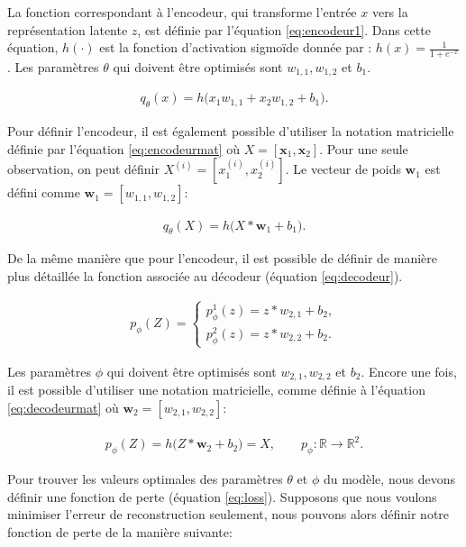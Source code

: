 La fonction correspondant à l'encodeur, qui transforme l'entrée $x$ vers la représentation latente $z$, est définie par l'équation \ref{eq:encodeur1}. Dans cette équation, $h(\cdot)$ est la fonction d'activation sigmoïde donnée par : $h(x)=\frac{1}{1+e^{-x}}$. Les paramètres $\theta$ qui doivent être optimisés sont $w_{1,1}, w_{1,2}$ et $b_1$. 

\begin{gather}  \label{eq:encodeur1}
q_{\theta}(x)=h\big(x_1w_{1,1} + x_2 w_{1,2} + b_1\big).
\end{gather}

Pour définir l'encodeur, il est également possible d'utiliser la notation matricielle définie par l'équation \ref{eq:encodeurmat} où $X = [\boldsymbol x_1, \boldsymbol x_2]$. Pour une seule observation, on peut définir $X^{(i)} = [x_{1}^{(i)}, x_{2}^{(i)}]$. Le vecteur de poids $\boldsymbol w_1$ est défini comme $\boldsymbol w_1 = [w_{1,1}, w_{1,2}]$:

\begin{gather}  \label{eq:encodeurmat}
q_{\theta}(X)=h\big(X*\boldsymbol w_1 + b_1\big).
\end{gather}

De la même manière que pour l'encodeur, il est possible de définir de manière plus détaillée la fonction associée au décodeur (équation \ref{eq:decodeur}).

\begin{gather}  \label{eq:decodeur}
p_{\phi}(Z)=
\begin{cases}
p_{\phi}^1(z) = z*w_{2,1}+b_2, \\
p_{\phi}^2(z) = z*w_{2,2}+b_2.
\end{cases}
\end{gather}

Les paramètres $\phi$ qui doivent être optimisés sont $w_{2,1}, w_{2,2}$ et $b_2$. Encore une fois, il est possible d'utiliser une notation matricielle, comme définie à l'équation \ref{eq:decodeurmat} où $\boldsymbol w_2 = [w_{2,1}, w_{2,2}]$:

\begin{gather} \label{eq:decodeurmat}
p_{\phi}(Z)=h\big(Z*\boldsymbol w_2 + b_2\big)=\hat{X}, \qquad
p_{\phi}: \mathbb{R}\rightarrow \mathbb{R}^2.
\end{gather}

Pour trouver les valeurs optimales des paramètres $\theta$ et $\phi$ du modèle, nous devons définir une fonction de perte (équation \ref{eq:loss}). Supposons que nous voulons minimiser l'erreur de reconstruction seulement, nous pouvons alors définir notre fonction de perte de la manière suivante:

